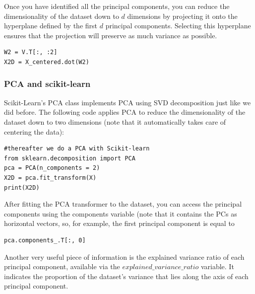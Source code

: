 \documentclass{beamer}
\begin{document}
\begin{frame}
Once you have identified all the principal components, you can reduce the dimensionality of the dataset
down to $d$ dimensions by projecting it onto the hyperplane defined by the first $d$ principal components.
Selecting this hyperplane ensures that the projection will preserve as much variance as possible. 



\begin{verbatim}
W2 = V.T[:, :2]
X2D = X_centered.dot(W2)

\end{verbatim}
\end{frame}

\begin{frame}
\frametitle{PCA and scikit-learn}

Scikit-Learn’s PCA class implements PCA using SVD decomposition just like we did before. The
following code applies PCA to reduce the dimensionality of the dataset down to two dimensions (note
that it automatically takes care of centering the data):






\begin{verbatim}
#thereafter we do a PCA with Scikit-learn
from sklearn.decomposition import PCA
pca = PCA(n_components = 2)
X2D = pca.fit_transform(X)
print(X2D)

\end{verbatim}

After fitting the PCA transformer to the dataset, you can access the principal components using the
components variable (note that it contains the PCs as horizontal vectors, so, for example, the first
principal component is equal to 


\begin{verbatim}
pca.components_.T[:, 0]

\end{verbatim}

Another very useful piece of information is the explained variance ratio of each principal component,
available via the $explained\_variance\_ratio$ variable. It indicates the proportion of the dataset’s
variance that lies along the axis of each principal component.
\end{frame}
\end{document}
